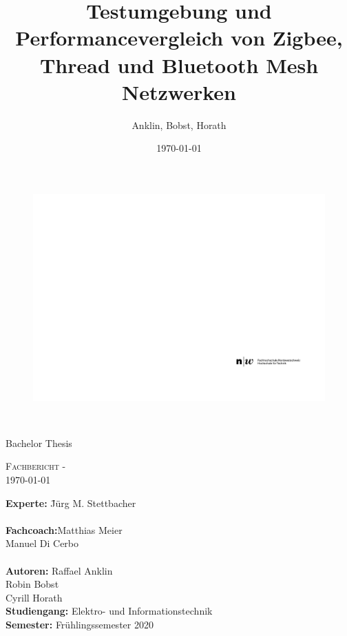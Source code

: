 \documentclass[final]{fhnwreport}       %
\title{Testumgebung und Performancevergleich von Zigbee, Thread und Bluetooth Mesh Netzwerken}  		        %
\author{Anklin, Bobst, Horath}      				    %
\date{\today}          				   %
\begin{document}
\thispagestyle{empty}
	\begin{figure}
		 \vspace*{-\topskip}\vspace*{-\headsep}
		\includegraphics[scale=1]{graphics/fhnw_ht_logo_de.pdf}
	\end{figure}
	\begin{center}
		\vspace*{2cm}
		{\huge{\textbf{\thetitle}}}\\
		\vspace*{1cm}
		
		{\huge{Bachelor Thesis}}\\
		\vspace*{0.5cm}
		
		{\scshape\Large Fachbericht - \theauthor \\} \Large{\today}
		\vfill
		
		
		\begin{normalsize}
			{\begin{tabbing}
						
					\textbf{Experte:} \hspace{6cm}\= Jürg M. Stettbacher\\					
					\\[0.4cm]
					
					\textbf{Fachcoach:}\>Matthias Meier\\
					\>Manuel Di Cerbo\\
					
					\\[0.4cm]
					
					\textbf{Autoren:} \>Raffael Anklin \\ \>Robin Bobst \\ \>Cyrill Horath
					\\[0.8cm]
					\textbf{Studiengang:} \>Elektro- und Informationstechnik
					\\[0.8cm]	\textbf{Semester:} \>Frühlingssemester 2020
			\end{tabbing}}
		\end{normalsize}
		\vfill
	\end{center}
\clearpage
\end{document}
